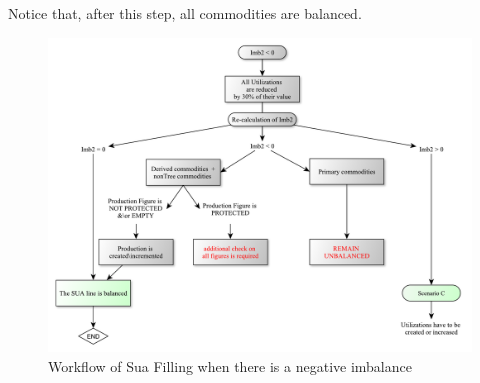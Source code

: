 \documentclass[]{article}
\begin{document}
Notice that, after this step, all commodities are balanced.

\begin{figure}[h]

{\centering \includegraphics{images/StandBal/06b_NegativeImbalance} 

}

\caption{\label{fig:f5}Workflow of Sua Filling when there is a negative imbalance}\label{fig:f6}
\end{figure}
\end{document}
